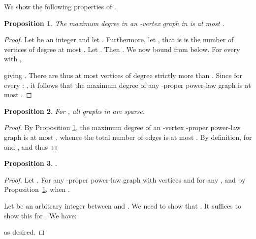 \documentclass{article}
\newtheorem{proposition}{Proposition}
\theoremstyle{remark}
\begin{document}
We show the following properties of . 
\begin{proposition}\label{prop:maxvertexproper}\label{prop:maxdegree}
The maximum degree in an -vertex graph in  is at most .
\end{proposition}

\begin{proof}
Let  be an integer and let . 
Furthermore, let , that is  is the number of vertices of degree at most . Let . Then
. We now bound  from below.
For every  with ,

giving . There are thus at most  vertices of degree strictly more than . Since for every : , it follows that the maximum degree of any -proper power-law graph is at most .
\end{proof}

\begin{proposition}\label{prop:powerlawsparse}
For , all graphs in  are sparse.
\end{proposition}
\begin{proof}
By Proposition \ref{prop:maxvertexproper}, the maximum degree of an -vertex -proper power-law
graph is at most , whence
the total number of edges is at most . By definition,
 for  and , and thus

\end{proof}

\begin{proposition}\label{prop:Contained}
.
\end{proposition}
\begin{proof}
Let . For any -proper power-law graph with  vertices and for any ,  and by Proposition~\ref{prop:maxvertexproper},  when .

Let  be an arbitrary integer between  and . We need to show that . It suffices to show this for . We have:

as desired.
\end{proof}
\end{document}
